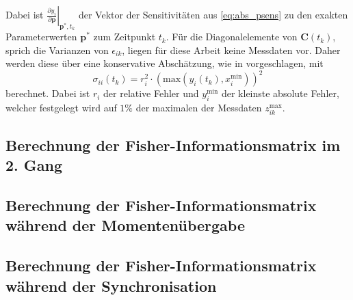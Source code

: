 Dabei ist $\left.\frac{\partial y_i}{\partial \pmb{p}}\right|_{\pmb{p}^*,t_k}$ der Vektor der Sensitivitäten aus \eqref{eq:abs_psens} zu den exakten Parameterwerten $\pmb{p}^*$ zum Zeitpunkt $t_k$. Für die Diagonalelemente von $\pmb{C}(t_k)$, sprich die Varianzen von $\epsilon_{ik}$, liegen für diese Arbeit keine Messdaten vor. Daher werden diese über eine konservative Abschätzung, wie in \cite{Majer.1998} vorgeschlagen, mit
\begin{equation}
\sigma_{ii}(t_k)=r_i^2\cdot\left(\mathrm{max}\left(y_i(t_k),x_i^\mathrm{min}\right)\right)^2
\end{equation}
berechnet. Dabei ist $r_i$ der relative Fehler und $y_i^\mathrm{min}$ der kleinste absolute Fehler, welcher festgelegt wird auf $1\%$ der maximalen der Messdaten $z^\mathrm{max}_{ik}$. 

\subsection{Berechnung der Fisher-Informationsmatrix im 2. Gang}
\subsection{Berechnung der Fisher-Informationsmatrix während der Momentenübergabe}
\subsection{Berechnung der Fisher-Informationsmatrix während der Synchronisation}